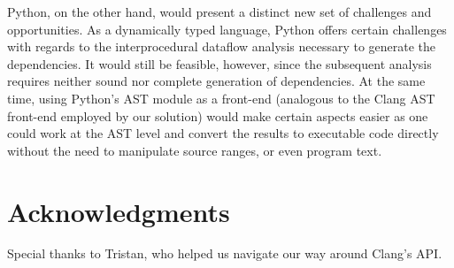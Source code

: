 \documentclass[preprint]{acm_proc_article-sp}
\begin{document}

Python, on the other hand, would present a distinct new set of challenges and
opportunities. As a dynamically typed language, Python offers certain challenges
with regards to the interprocedural dataflow analysis necessary to generate the
dependencies. It would still be feasible, however, since the subsequent analysis
requires neither sound nor complete generation of dependencies. At the same
time, using Python's AST module as a front-end (analogous to the Clang AST
front-end employed by our solution) would make certain aspects easier as one
could work at the AST level and convert the results to executable code directly
without the need to manipulate source ranges, or even program text.

\section{Acknowledgments}

Special thanks to Tristan, who helped us navigate our way around Clang's API.



\end{document}
